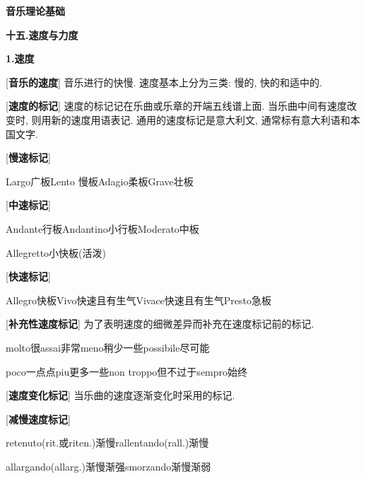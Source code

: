 

\begin{center} 
 \Large \textbf{音乐理论基础}\par
 \textbf{十五.速度与力度}
\end{center}

\large 
\begin{center}
 \textbf{1.速度}\\
\end{center}

[\textbf{音乐的速度}] 音乐进行的快慢. 速度基本上分为三类: 慢的, 快的和适中的.\par

[\textbf{速度的标记}] 速度的标记记在乐曲或乐章的开端五线谱上面. 当乐曲中间有速度改变时, 则用新的速度用语表记. 通用的速度标记是意大利文, 通常标有意大利语和本国文字.\par

[\textbf{慢速标记}]\par
\qquad Largo\quad 广板\qquad Lento \quad 慢板\qquad Adagio\quad 柔板\qquad Grave\quad 壮板\par

[\textbf{中速标记}]\par
\qquad Andante\quad 行板\qquad Andantino\quad 小行板\qquad Moderato\quad 中板\par
\qquad Allegretto\quad 小快板(活泼)\par

[\textbf{快速标记}] \par
\qquad Allegro\quad 快板\qquad Vivo\quad 快速且有生气\qquad Vivace\quad 快速且有生气\qquad Presto\quad 急板\par

[\textbf{补充性速度标记}] 为了表明速度的细微差异而补充在速度标记前的标记.\par
\qquad molto\quad 很\qquad assai\quad 非常\qquad meno\quad 稍少一些\qquad possibile\quad 尽可能\par
\qquad poco\quad 一点点\qquad piu\quad 更多一些\qquad non troppo\quad 但不过于\qquad sempro\quad 始终\par

[\textbf{速度变化标记}] 当乐曲的速度逐渐变化时采用的标记.\par

[\textbf{减慢速度标记}]\par
\qquad retenuto(rit.或riten.)\quad 渐慢\qquad rallentando(rall.)\quad 渐慢\par
\qquad allargando(allarg.)\quad 渐慢渐强\qquad smorzando\quad 渐慢渐弱\par

